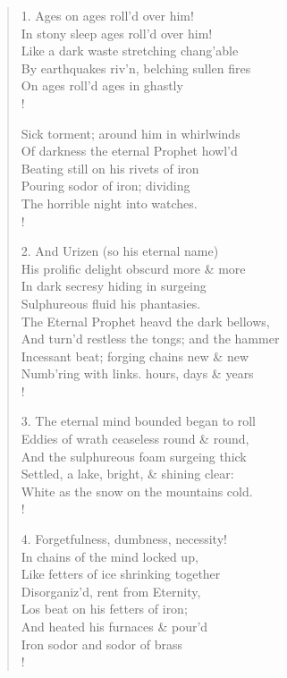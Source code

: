 \documentclass[9pt]{extarticle}
\begin{document}
\begin{verse}
\begin{altverse} 
		
		1. Ages on ages roll'd over him!\\
		In stony sleep ages roll'd over him!\\
		Like a dark waste stretching chang'able\\
		By earthquakes riv'n, belching sullen fires\\
		On ages roll'd ages in ghastly\\!
		
		Sick torment; around him in whirlwinds\\
		Of darkness the eternal Prophet howl'd\\
		Beating still on his rivets of iron\\
		Pouring sodor of iron; dividing\\
		The horrible night into watches.\\!
		
		2. And Urizen (so his eternal name)\\
		His prolific delight obscurd more \& more\\
		In dark secresy hiding in surgeing\\
		Sulphureous fluid his phantasies.\\
		The Eternal Prophet heavd the dark bellows,\\
		And turn'd restless the tongs; and the hammer\\
		Incessant beat; forging chains new \& new\\
		Numb'ring with links. hours, days \& years\\!
		
		3. The eternal mind bounded began to roll\\
		Eddies of wrath ceaseless round \& round,\\
		And the sulphureous foam surgeing thick\\
		Settled, a lake, bright, \& shining clear:\\
		White as the snow on the mountains cold.\\!
		
		4. Forgetfulness, dumbness, necessity!\\
		In chains of the mind locked up,\\
		Like fetters of ice shrinking together\\
		Disorganiz'd, rent from Eternity,\\
		Los beat on his fetters of iron;\\
		And heated his furnaces \& pour'd\\
		Iron sodor and sodor of brass\\!
		

\end{altverse}
\end{verse}
\end{document}

